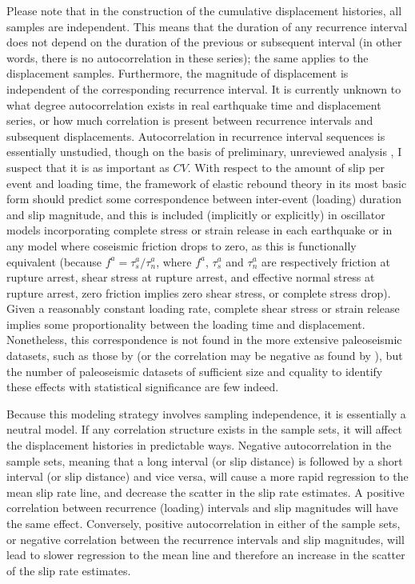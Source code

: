 \documentclass[se, manuscript]{copernicus}
\begin{document}
Please note that in the construction of the cumulative displacement
histories, all samples are independent. This means that the duration of any
recurrence interval does not depend on the duration of the previous or
subsequent interval (in other words, there is no autocorrelation in these
series); the same applies to the displacement samples. Furthermore, the
magnitude of displacement is independent of the corresponding recurrence
interval. It is currently unknown to what degree autocorrelation exists in
real earthquake time and displacement series, or how much correlation is
present between recurrence intervals and subsequent displacements.
Autocorrelation in recurrence interval sequences is essentially unstudied,
though on the basis of preliminary, unreviewed analysis
\citep{styron_survival_2017}, I suspect that it is as important as \(CV\).
With respect to the amount of slip per event and loading time, the framework
of elastic rebound theory in its most basic form should predict some
correspondence between inter-event (loading) duration and slip magnitude, and
this is included (implicitly or explicitly) in oscillator models
incorporating complete stress or strain release in each earthquake
\citep[e.g.,][]{matthews_brownian_2002,dicaprio_post-seismic_2008} or in any
model where coseismic friction drops to zero, as this is functionally
equivalent (because \(f^a = \tau^a_s / \tau^a_n\), where \(f^a\),
\(\tau^a_s\) and \(\tau^a_n\) are respectively friction at rupture arrest,
shear stress at rupture arrest, and effective normal stress at rupture
arrest, zero friction implies zero shear stress, or complete stress drop).
Given a reasonably constant loading rate, complete shear stress or strain
release implies some proportionality between the loading time and
displacement. Nonetheless, this correspondence is not found in the more
extensive paleoseismic datasets, such as those by
\citet{benedetti_earthquake_2013} (or the correlation may be negative as
found by \citet{weldon_wrightwood_2004}), but the number of paleoseismic
datasets of sufficient size and cquality to identify these effects with
statistical significance are few indeed.

Because this modeling strategy involves sampling independence, it is
essentially a neutral model. If any correlation structure exists in the
sample sets, it will affect the displacement histories in predictable
ways. Negative autocorrelation in the sample sets, meaning that a long
interval (or slip distance) is followed by a short interval (or slip
distance) and vice versa, will cause a more rapid regression to the mean
slip rate line, and decrease the scatter in the slip rate estimates. A
positive correlation between recurrence (loading) intervals and slip
magnitudes will have the same effect. Conversely, positive
autocorrelation in either of the sample sets, or negative correlation
between the recurrence intervals and slip magnitudes, will lead to
slower regression to the mean line and therefore an increase in the
scatter of the slip rate estimates.
\end{document}
